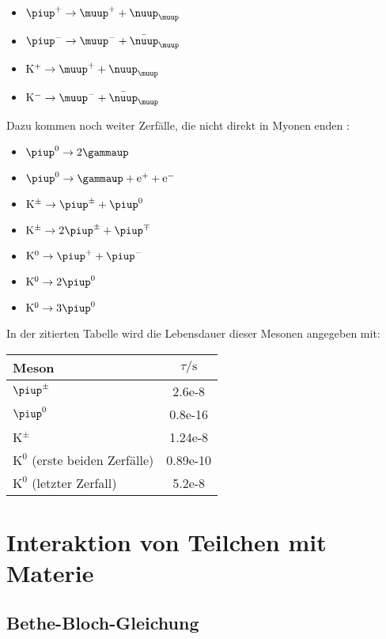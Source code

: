 \documentclass[11pt, ngerman, fleqn, DIV=15, headinclude, BCOR=2cm]{scrreprt}
\begin{document}
\begin{itemize}
    \item
        $\piup^+ \to \muup^+ + \nuup_\muup$
    \item
        $\piup^- \to \muup^- + \bar \nuup_\muup$
    \item
        $\mathrm K^+ \to \muup^+ + \nuup_\muup$
    \item
        $\mathrm K^- \to \muup^- + \bar \nuup_\muup$
\end{itemize}

Dazu kommen noch weiter Zerfälle, die nicht direkt in Myonen enden \parencite[Tabelle~19.6]{meschede-gerthsen_24}:

\begin{itemize}
    \item
        $\piup^0 \to 2 \gammaup$
    \item
        $\piup^0 \to \gammaup + \eup^+ + \eup^-$
    \item
        $\mathrm K^\pm \to \piup^\pm + \piup^0$
    \item
        $\mathrm K^\pm \to 2 \piup^\pm + \piup^\mp$
    \item
        $\mathrm K^0 \to \piup^+ + \piup^-$
    \item
        $\mathrm K^0 \to 2 \piup^0$
    \item
        $\mathrm K^0 \to 3 \piup^0$
\end{itemize}

In der zitierten Tabelle wird die Lebensdauer dieser Mesonen angegeben mit:

\begin{tabular}{lS}
    Meson & {$\tau/\si\second$} \\
    \midrule
    $\piup^\pm$ & 2.6e-8 \\
    $\piup^0$ & 0.8e-16 \\
    $\mathrm K^\pm$ & 1.24e-8 \\
    $\mathrm K^0$ (erste beiden Zerfälle) & 0.89e-10 \\
    $\mathrm K^0$ (letzter Zerfall) & 5.2e-8 \\
\end{tabular}

\section{Interaktion von Teilchen mit Materie}

\subsection{Bethe-Bloch-Gleichung}
\label{sec:bethe-bloch}
\end{document}
